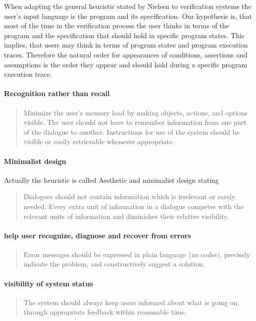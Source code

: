\documentclass{article}
\begin{document}
When adapting the general heuristic stated by Nielsen to verification systems 
the user's input language is the program and its specification. Our hypothesis 
is, that most of the time in the verification process the user thinks in 
terms of the program and the specification that should hold in specific 
program states. This implies, that users may think in terms of program states 
and program execution traces. Therefore the natural order for appearances of 
conditions, assertions and assumptions is the order they appear and 
should hold during a specific program execution trace.
\paragraph{Recognition rather than recall}
\begin{quote}
 Minimize the user's memory load by making objects, actions, and options 
visible. The user should not have to remember information from one part of the 
dialogue to another. Instructions for use of the system should be visible or 
easily retrievable whenever appropriate.
\end{quote}

\paragraph{Minimalist design}
Actually the heuristic is called Aesthetic and minimalist design stating 
\begin{quote}
 Dialogues should not contain information which is irrelevant or rarely needed. 
Every extra unit of information in a dialogue competes with the relevant units 
of information and diminishes their relative visibility.
\end{quote}

\paragraph{help user recognize, diagnose and recover from errors}
\begin{quote}
 Error messages should be expressed in plain language (no codes), precisely 
indicate the problem, and constructively suggest a solution.
\end{quote}

\paragraph{ visibility of system status}
\begin{quote}
 The system should always keep users informed about what is going on, through 
appropriate feedback within reasonable time.
\end{quote}
\end{document}
